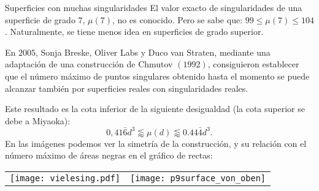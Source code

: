 \begin{surferPage}[216 Singularidades]{Superficies con muchas singularidades}
    El valor exacto de singularidades de una superficie de grado $7$, $\mu(7)$, no es conocido.
    Pero se sabe que: $99\le \mu(7) \le 104$. Naturalmente, se tiene menos idea en superficies de grado superior.
    
    En $2005$, Sonja Breske, Oliver Labs y Duco van Straten, mediante una adaptación de 
    una construcción de Chmutov $(1992)$, consiguieron establecer que el número máximo de puntos singulares
    obtenido hasta el momento se puede alcanzar también por superficies reales con singularidades reales.
    
    Este resultado es la cota inferior de la siguiente desigualdad (la cota superior se debe a Miyaoka):
    \[0,41\bar{6}d^3 \lessapprox \mu(d) \lessapprox 0.44\bar{4} d^3.\]
     En las imágenes podemos ver la simetría de la construcción, y su relación
     con el número máximo de áreas negras en el gráfico de rectas:
    \begin{center}
      \begin{tabular}{c@{\qquad}c}
        \texttt{[image: vielesing.pdf]}
        &
        \texttt{[image: p9surface\_von\_oben]}
      \end{tabular}
    \end{center}
\end{surferPage}
